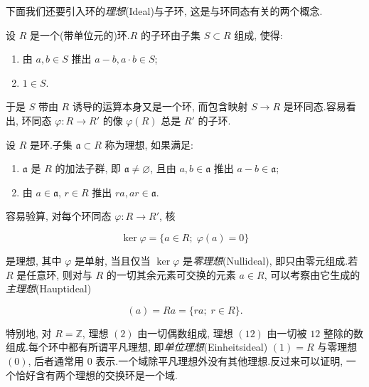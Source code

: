 下面我们还要引入环的\emph{理想}(\textup{Ideal})与子环, 这是与环同态有关的两个概念.

\begin{definition}[子环]\label{def:5.1.8}
设 $R$ 是一个(带单位元的)环.$R$ 的子环由子集 $S \subset R$ 组成, 使得:
\begin{enumerate}
\item[(i)] 由 $a, b \in S$ 推出 $a - b, a \cdot b \in S$;
\item[(ii)] $1 \in S$.
\end{enumerate}
\end{definition}

于是 $S$ 带由 $R$ 诱导的运算本身又是一个环, 而包含映射 $S \longrightarrow R$ 是环同态.容易看出, 环同态 $\varphi \colon R \longrightarrow R'$ 的像 $\varphi(R)$ 总是 $R'$ 的子环.

\begin{definition}[理想]\label{def:5.1.9}
设 $R$ 是环.子集 $\mathfrak{a} \subset R$ 称为理想, 如果满足:
\begin{enumerate}
\item[(i)] $\mathfrak{a}$ 是 $R$ 的加法子群, 即 $\mathfrak{a} \neq \varnothing$, 且由 $a, b \in \mathfrak{a}$ 推出 $a - b \in \mathfrak{a}$;
\item[(ii)] 由 $a \in \mathfrak{a}$, $r \in R$ 推出 $ra, ar \in \mathfrak{a}$.
\end{enumerate}
\end{definition}

容易验算, 对每个环同态 $\varphi \colon R \longrightarrow R'$, 核

\[
\ker \varphi = \{a \in R;\; \varphi(a) = 0\}
\]

是理想, 其中 $\varphi$ 是单射, 当且仅当 $\ker \varphi$ 是\emph{零理想}(\textup{Nullideal}), 即只由零元组成.若 $R$ 是任意环, 则对与 $R$ 的一切其余元素可交换的元素 $a \in R$, 可以考察由它生成的\emph{主理想}(\textup{Hauptideal})

\[
(a) = Ra = \{ra;\; r \in R\}\text{.}
\]

特别地, 对 $R = \mathbb{Z}$, 理想 $(2)$ 由一切偶数组成, 理想 $(12)$ 由一切被 $12$ 整除的数组成.每个环中都有所谓平凡理想, 即\emph{单位理想}(\textup{Einheitsideal}) $(1) = R$ 与零理想 $(0)$, 后者通常用 $0$ 表示.一个域除平凡理想外没有其他理想.反过来可以证明, 一个恰好含有两个理想的交换环是一个域.

